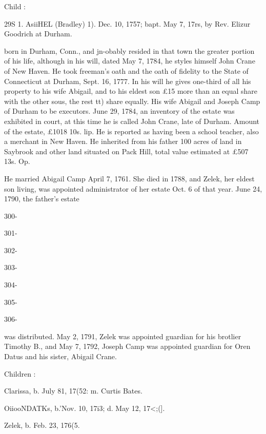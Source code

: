 \documentclass{book}
\begin{document}
Child : 

29S 1. AsiiHEL (Bradley) 1). Dec. 10, 1757; bapt. May 7, 17rs, by 
Rev. Elizur Goodrich at Durham. 

born in Durham, Conn., and jn-obably resided in that town the 
greater portion of his life, although in his will, dated May 7, 
1784, he styles himself John Crane of New Haven. He took 
freeman's oath and the oath of fidelity to the State of Connecticut 
at Durham, Sept. 16, 1777. In his will he gives one-third of all 
his property to his wife Abigail, and to his eldest son £15 more 
than an equal share with the other sous, the rest tt) share equally. 
His wife Abigail and Joseph Camp of Durham to be executors. 
June 29, 1784, an inventory of the estate was exhibited in court, 
at this time he is called John Crane, late of Durham. Amount 
of the estate, £1018 10s.  lip. He is reported as having been 
a school teacher, also a merchant in New Haven. He inherited 
from his father 100 acres of land in Saybrook and other land 
situated on Pack Hill, total value estimated at £507  13s.  Op. 

He married Abigail Camp April 7, 1761. She died in 1788, and 
Zelek, her eldest son living, was appointed administrator of her 
estate Oct. 6 of that year. June 24, 1790, the father's estate 



300- 




301- 




302- 




303- 




304- 




305- 




306- 






was distributed. May 2, 1791, Zelek was appointed guardian 
for his brotlier Timothy B., and May 7, 1792, Joseph Camp was 
appointed guardian for Oren Datus and his sister, Abigail Crane. 

Children : 

Clarissa, b. July 81, 17(52: m. Curtis Bates. 

OiiooNDATKs, b.'Nov. 10, 17i3; d. May 12, 17<;(]. 

Zelek, b. Feb. 23, 176(5. 
\end{document}
